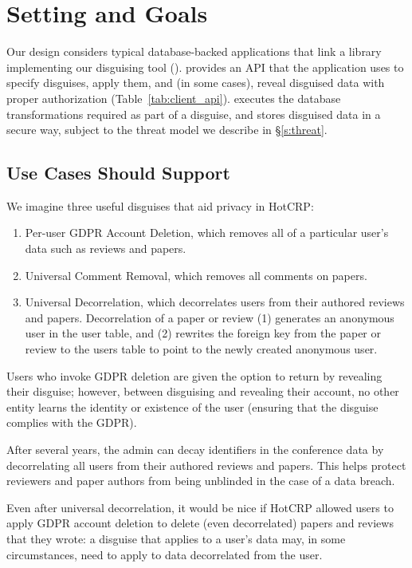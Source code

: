 \section{Setting and Goals}
Our design considers typical database-backed applications that link a library implementing our disguising
tool (\sys).
%
\sys provides an API that the application uses to specify disguises, apply them, and (in some
cases), reveal disguised data with proper authorization (Table~\ref{tab:client_api}).
%
\sys executes the database transformations required as part of a disguise, and stores
disguised data in a secure way, subject to the threat model we describe in \S\ref{s:threat}.

\subsection{Use Cases \sys Should Support}

We imagine three useful disguises that aid privacy in HotCRP: 
\begin{enumerate}
    \item Per-user GDPR Account Deletion, which
        removes all of a particular user's data such as reviews and papers.
    \item Universal Comment Removal, which removes all comments on papers.
    \item Universal Decorrelation, which decorrelates users from
        their authored reviews and papers. Decorrelation of a paper or review (1) generates an
        anonymous user in the user table, and (2) rewrites the foreign key from the paper or review
        to the users table to point to the newly created anonymous user.
\end{enumerate}

Users who invoke GDPR deletion are given the option to return by revealing their disguise; however,
between disguising and revealing their account, no other entity learns the identity or existence of
the user (ensuring that the disguise complies with the GDPR).

After several years, the admin can decay identifiers in the conference data by decorrelating all
users from their authored reviews and papers.  This helps protect reviewers and paper authors from
being unblinded in the case of a data breach.

Even after universal decorrelation, it would be nice if HotCRP allowed users to apply GDPR account
deletion to delete (even decorrelated) papers and reviews that they wrote: a disguise that applies
to a user's data may, in some circumstances, need to apply to data decorrelated from the user.

